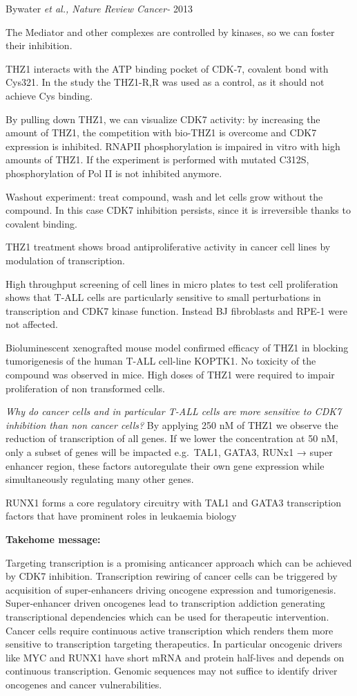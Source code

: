 Bywater \emph{et al., Nature Review Cancer-} 2013

The Mediator and other complexes are controlled by kinases, so we can foster their inhibition.

THZ1 interacts with the ATP binding pocket of CDK-7, covalent bond with Cys321. In the study the THZ1-R,R was used as a control, as it should not achieve Cys binding.

By pulling down THZ1, we can visualize CDK7 activity: by increasing the amount of THZ1, the competition with bio-THZ1 is overcome and CDK7 expression is inhibited. RNAPII phosphorylation is impaired in vitro with high amounts of THZ1. If the experiment is performed with mutated C312S, phosphorylation of Pol II is not inhibited anymore.

Washout experiment: treat compound, wash and let cells grow without the compound. In this case CDK7 inhibition persists, since it is irreversible thanks to covalent binding.

THZ1 treatment shows broad antiproliferative activity in cancer cell lines by modulation of transcription.

High throughput screening of cell lines in micro plates to test cell proliferation shows that T-ALL cells are particularly sensitive to small perturbations in transcription and CDK7 kinase function. Instead BJ fibroblasts and RPE-1 were not affected.

Bioluminescent xenografted mouse model confirmed efficacy of THZ1 in blocking tumorigenesis of the human T-ALL cell-line KOPTK1. No toxicity of the compound was observed in mice. High doses of THZ1 were required to impair proliferation of non transformed cells.

\emph{Why do cancer cells and in particular T-ALL cells are more sensitive to CDK7 inhibition than non cancer cells?} By applying 250 nM of THZ1 we observe the reduction of transcription of all genes. If we lower the concentration at 50 nM, only a subset of genes will be impacted e.g.~TAL1, GATA3, RUNx1 → super enhancer region, these factors autoregulate their own gene expression while simultaneously regulating many other genes.

 RUNX1 forms a core regulatory circuitry with TAL1 and GATA3 transcription factors that have prominent roles in leukaemia biology

\textbf{Takehome message:}

Targeting transcription is a promising anticancer approach which can be achieved by CDK7 inhibition. Transcription rewiring of cancer cells can be triggered by acquisition of super-enhancers driving oncogene expression and tumorigenesis. Super-enhancer driven oncogenes lead to transcription addiction generating transcriptional dependencies which can be used for therapeutic intervention. Cancer cells require continuous active transcription which renders them more sensitive to transcription targeting therapeutics. In particular oncogenic drivers like MYC and RUNX1 have short mRNA and protein half-lives and depends on continuous transcription. Genomic sequences may not suffice to identify driver oncogenes and cancer vulnerabilities.

